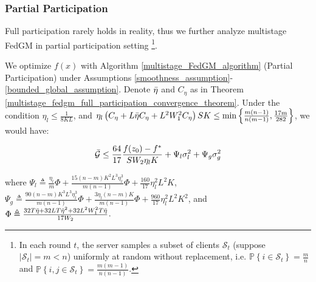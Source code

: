 \subsubsection{Partial Participation}
\label{subsec:partial_participation}

Full participation rarely holds in reality, thus we further analyze multistage FedGM in partial participation setting \footnote{In each round $t$, the server samples a subset of clients $\mathcal{S}_t$ (suppose $\left | \mathcal{S}_t \right | = m < n$) uniformly at random without replacement, i.e. $\mathbb{P}\left\{i\in\mathcal{S}_t\right\}=\frac{m}{n}$ and $\mathbb{P}\left\{i,j\in\mathcal{S}_t\right\}=\frac{m\left(m-1\right)}{n\left(n-1\right)}$.}.

\begin{theorem}
\label{multistage_fedgm_partial_participation_convergence_theorem}
We optimize $f(x)$ with Algorithm \ref{multistage_FedGM_algorithm} (Partial Participation) under Assumptions \ref{smoothness_assumption}-\ref{bounded_global_assumption}. Denote $\Bar{\eta}$ and $C_\eta$ as in Theorem \ref{multistage_fedgm_full_participation_convergence_theorem}. Under the condition $\eta_l\leq\frac{1}{8KL}$, and $\eta_l \left( C_\eta + L \Bar{\eta} C_\eta + L^2 W_1^2 C_\eta \right) SK \leq \min\left\{ \frac{m(n-1)}{n(m-1)}, \frac{17m}{282} \right\}$, we would have:

\begin{gather*}
\Bar{\mathcal{G}} \leq \frac{64}{17}\frac{f(z_0)-f^\ast}{S W_2 \eta_l K}  
+ \Psi_l \sigma_l^2
+ \Psi_g \sigma_g^2
\label{multistage_fedgm_partial_participation_bound}
\end{gather*}


where $\Psi_l  \triangleq \frac{\eta_l}{m}\Phi +\frac{15\left(n-m\right)K^2L^3\eta_l^3}{m\left(n-1\right)}\Phi + \frac{160}{17} \eta_l^2L^2K$, $\Psi_g \triangleq  \frac{90\left(n-m\right)K^3L^3\eta_l^3}{m\left(n-1\right)}\Phi  +  \frac{3\eta_l\left(n-m\right)K}{m\left(n-1\right)}\Phi     + \frac{960}{17} \eta_l^2L^2K^2$, and $\Phi \triangleq \frac{32 T \Bar{\eta} + 32 L T \hat{\eta}^2 + 32 L^2 W_1^2 T \Bar{\eta}}{17 W_2}$.

\iffalse
where 
\begin{gather*}
\Psi_l  \triangleq \frac{\eta_l}{m}\Phi +\frac{15\left(n-m\right)K^2L^3\eta_l^3}{m\left(n-1\right)}\Phi + \frac{160}{17} \eta_l^2L^2K\\ 
\Psi_g \triangleq  \frac{90\left(n-m\right)K^3L^3\eta_l^3}{m\left(n-1\right)}\Phi  +  \frac{3\eta_l\left(n-m\right)K}{m\left(n-1\right)}\Phi     + \frac{960}{17} \eta_l^2L^2K^2\\
\Phi \triangleq \frac{32 T \Bar{\eta} + 32 L T \hat{\eta}^2 + 32 L^2 W_1^2 T \Bar{\eta}}{17 W_2}
\nonumber
\end{gather*}
\fi

\end{theorem}

